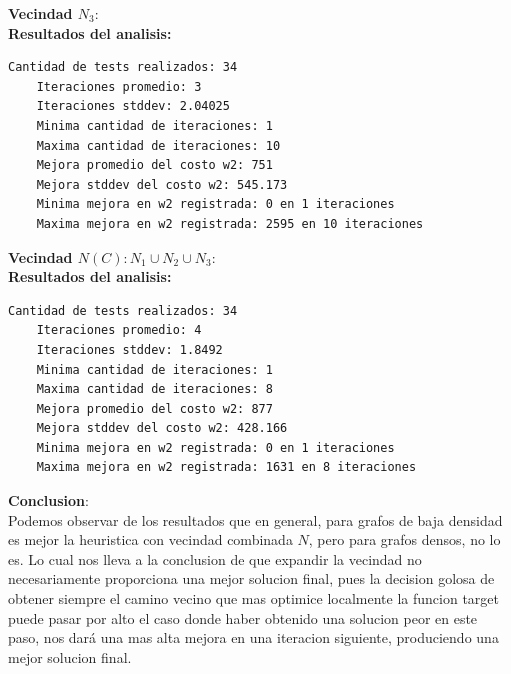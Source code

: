 \textbf{Vecindad $N_3$}:\\%
\textbf{Resultados del analisis:}
\begin{lstlisting}[frame=single]
	Cantidad de tests realizados: 34
	Iteraciones promedio: 3
	Iteraciones stddev: 2.04025
	Minima cantidad de iteraciones: 1
	Maxima cantidad de iteraciones: 10
	Mejora promedio del costo w2: 751
	Mejora stddev del costo w2: 545.173
	Minima mejora en w2 registrada: 0 en 1 iteraciones
	Maxima mejora en w2 registrada: 2595 en 10 iteraciones
\end{lstlisting}

\textbf{Vecindad $N(C): N_1 \cup N_2 \cup N_3$}:\\
\textbf{Resultados del analisis:}
\begin{lstlisting}[frame=single]
	Cantidad de tests realizados: 34
	Iteraciones promedio: 4
	Iteraciones stddev: 1.8492
	Minima cantidad de iteraciones: 1
	Maxima cantidad de iteraciones: 8
	Mejora promedio del costo w2: 877
	Mejora stddev del costo w2: 428.166
	Minima mejora en w2 registrada: 0 en 1 iteraciones
	Maxima mejora en w2 registrada: 1631 en 8 iteraciones
\end{lstlisting}

\vspace{1cm}
\textbf{Conclusion}:\\
Podemos observar de los resultados que en general, para grafos de baja densidad es mejor la heuristica con vecindad combinada $N$, pero para grafos densos, no lo es. Lo cual nos lleva a la conclusion de que expandir la vecindad no necesariamente proporciona una mejor solucion final, pues la decision golosa de obtener siempre el camino vecino que mas optimice localmente la funcion target puede pasar por alto el caso donde haber obtenido una solucion peor en este paso, nos dar\'a una mas alta mejora en una iteracion siguiente, produciendo una mejor solucion final.